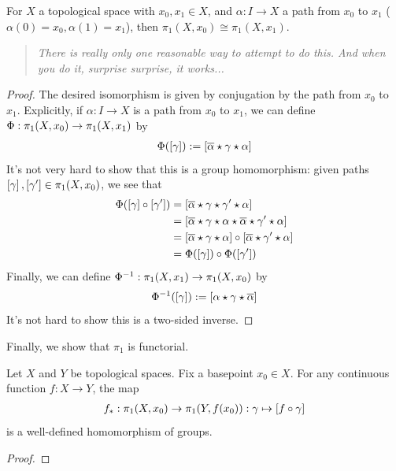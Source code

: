 \begin{boxtheorem}
    For $X$ a topological space with $x_0,x_1 \in X$, and $\alpha : I \to X$ a path from $x_0$ to $x_1$ ($\alpha(0)=x_0, \alpha(1)=x_1$), then $\pi_1(X,x_0) \cong \pi_1(X,x_1)$.
\end{boxtheorem}
\begin{quote}
    \textit{There is really only one reasonable way to attempt to do this. And when you do it, surprise surprise, it works...}
\end{quote}
\begin{proof}
    The desired isomorphism is given by conjugation by the path from $x_0$ to $x_1$. Explicitly, if $\alpha : I \to X$ is a path from $x_0$ to $x_1$, we can define $\Phi : \pi_1\!\left( X, x_0 \right) \to \pi_1\!\left( X, x_1 \right)$ by
    \begin{align*}
        \Phi\!\left( \left[ \gamma \right] \right) := \left[ \overline{\alpha} \star \gamma \star \alpha \right]
    \end{align*}
    It's not very hard to show that this is a group homomorphism: given paths $\left[ \gamma \right], \left[ \gamma' \right] \in \pi_1\!\left( X, x_0 \right)$, we see that
    \begin{align*}
        \Phi\!\left( \left[ \gamma \right] \circ \left[ \gamma' \right] \right)
        &= \left[ \overline{\alpha} \star \gamma \star \gamma' \star \alpha \right] \\
        &= \left[ \overline{\alpha} \star \gamma \star \alpha \star \overline{\alpha} \star \gamma' \star \alpha \right] \\
        &= \left[ \overline{\alpha} \star \gamma \star \alpha \right] \circ \left[ \overline{\alpha} \star \gamma' \star \alpha \right] \\
        &= \Phi\!\left( \left[ \gamma \right] \right) \circ \Phi\!\left( \left[ \gamma' \right] \right)
    \end{align*}
    Finally, we can define $\Phi^{-1} : \pi_1\!\left( X, x_1 \right) \to \pi_1\!\left( X, x_0 \right)$ by
    \begin{align*}
        \Phi^{-1}\!\left( \left[ \gamma \right] \right) := \left[ {\alpha} \star \gamma \star \overline{\alpha} \right]
    \end{align*}
    It's not hard to show this is a two-sided inverse.
\end{proof}

Finally, we show that $\pi_1$ is functorial.

\begin{boxproposition}
    Let $X$ and $Y$ be topological spaces. Fix a basepoint $x_0 \in X$. For any continuous function $f : X \to Y$, the map
    \begin{align*}
        f_* : \pi_1\!\left( X, x_0 \right) \to \pi_1\!\left( Y, f\!\left( x_0 \right) \right) : \gamma \mapsto \left[ f \circ \gamma \right]
    \end{align*}
    is a well-defined homomorphism of groups.
\end{boxproposition}
\begin{proof}
\sorry
    
\end{proof}

